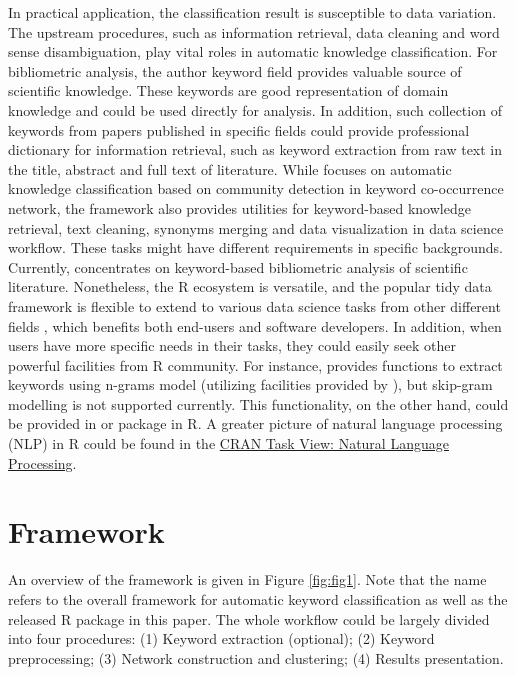 In practical application, the classification result is susceptible to
data variation. The upstream procedures, such as information retrieval,
data cleaning and word sense disambiguation, play vital roles in
automatic knowledge classification. For bibliometric analysis, the
author keyword field provides valuable source of scientific knowledge.
These keywords are good representation of domain knowledge and could be
used directly for analysis. In addition, such collection of keywords
from papers published in specific fields could provide professional
dictionary for information retrieval, such as keyword extraction from
raw text in the title, abstract and full text of literature. While
focuses on automatic knowledge classification based on community
detection in keyword co-occurrence network, the  framework
also provides utilities for keyword-based knowledge retrieval, text
cleaning, synonyms merging and data visualization in data science
workflow. These tasks might have different requirements in specific
backgrounds. Currently,  concentrates on keyword-based
bibliometric analysis of scientific literature. Nonetheless, the R
ecosystem is versatile, and the popular tidy data framework is flexible
to extend to various data science tasks from other different fields
\citep{wickham2014tidy, wickham2016r}, which benefits both end-users and
software developers. In addition, when users have more specific needs in
their tasks, they could easily seek other powerful facilities from R
community. For instance,  provides functions to extract
keywords using n-grams model (utilizing facilities provided by
), but skip-gram modelling is not supported currently.
This functionality, on the other hand, could be provided in
 or  package in R. A greater
picture of natural language processing (NLP) in R could be found in the
\href{https://cran.r-project.org/web/views/NaturalLanguageProcessing.html}{CRAN
Task View: Natural Language Processing}.

\hypertarget{framework}{%
\section{Framework}\label{framework}}

An overview of the framework is given in Figure \ref{fig:fig1}. Note
that the name  refers to the overall framework for
automatic keyword classification as well as the released R package in
this paper. The whole workflow could be largely divided into four
procedures: (1) Keyword extraction (optional); (2) Keyword
preprocessing; (3) Network construction and clustering; (4) Results
presentation.

